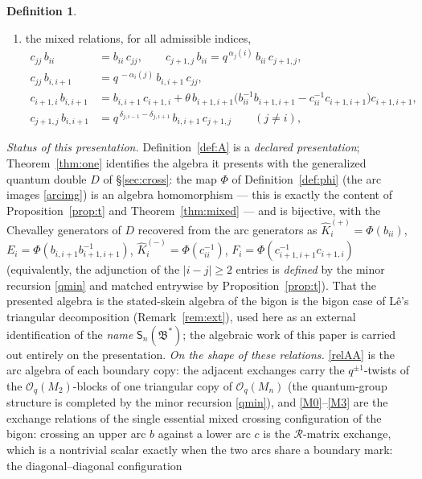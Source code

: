 \documentclass[11pt]{article}
\theoremstyle{definition}
\newtheorem{definition}[theorem]{Definition}
\theoremstyle{remark}
\newcommand{\B}{\mathfrak{B}}
\newcommand{\Sn}{\mathsf{S}_n}
\newcommand{\hK}{\hat K}
\newcommand{\tht}{\theta}
\begin{document}
\begin{definition}
\begin{enumerate}[label=(\Alph*),leftmargin=2.2em]
\item\label{relB} the mixed relations, for all admissible indices,
  \begin{align}
  c_{jj}\,b_{ii}&=b_{ii}\,c_{jj},
  \qquad
  c_{j+1,j}\,b_{ii}=q^{\,\alpha_j(i)}\,b_{ii}\,c_{j+1,j},
  \label{M0}\tag{M0}\\
  c_{jj}\,b_{i,i+1}&=q^{\,-\alpha_i(j)}\,b_{i,i+1}\,c_{jj},
  \label{M1}\tag{M1}\\
  c_{i+1,i}\,b_{i,i+1}&=b_{i,i+1}\,c_{i+1,i}
  +\tht\,b_{i+1,i+1}\bigl(b_{ii}^{-1}b_{i+1,i+1}
      -c_{ii}^{-1}c_{i+1,i+1}\bigr)c_{i+1,i+1},
  \label{M2}\tag{M2}\\
  c_{j+1,j}\,b_{i,i+1}&=q^{\,\delta_{j,i-1}-\delta_{j,i+1}}\,
  b_{i,i+1}\,c_{j+1,j}\qquad(j\ne i),
  \label{M3}\tag{M3}
  \end{align}
\end{enumerate}
\emph{Status of this presentation.}  Definition~\ref{def:A} is a
\emph{declared presentation}; Theorem~\ref{thm:one} identifies the
algebra it presents with the generalized quantum double $D$ of
\S\ref{sec:cross}: the map $\Phi$ of Definition~\ref{def:phi} (the
arc images \eqref{arcimg}) is an algebra homomorphism — this is
exactly the content of Proposition~\ref{prop:t} and
Theorem~\ref{thm:mixed} — and is bijective, with the Chevalley
generators of $D$ recovered from the arc generators as
$\hK_i^{(+)}=\Phi(b_{ii})$,
$E_i=\Phi(b_{i,i+1}b_{i+1,i+1}^{-1})$,
$\hK_i^{(-)}=\Phi(c_{ii}^{-1})$,
$F_i=\Phi(c_{i+1,i+1}^{-1}c_{i+1,i})$ (equivalently, the adjunction
of the $|i-j|\ge2$ entries is \emph{defined} by the minor recursion
\eqref{qmin} and matched entrywise by Proposition~\ref{prop:t}).  That the
presented algebra is the stated-skein algebra of the bigon is the
bigon case of L\^e's triangular decomposition
(Remark~\ref{rem:ext}), used here as an external identification of
the \emph{name} $\Sn(\B^*)$; the algebraic work of this paper is
carried out entirely on the presentation.
\emph{On the shape of these relations.}  \eqref{relAA} is the
arc algebra of each boundary copy: the adjacent exchanges carry the
$q^{\pm1}$-twists of the $\mathcal O_q(M_2)$-blocks of one
triangular copy of $\mathcal O_q(M_n)$ (the quantum-group structure
is completed by the minor recursion \eqref{qmin}), and
\eqref{M0}--\eqref{M3} are the exchange relations of the single
essential mixed crossing configuration of the bigon: crossing an
upper arc $b$ against a lower arc $c$ is the $\mathcal R$-matrix
exchange, which is a nontrivial scalar exactly when the two arcs
share a boundary mark: the diagonal--diagonal configuration

\end{definition}
\end{document}
